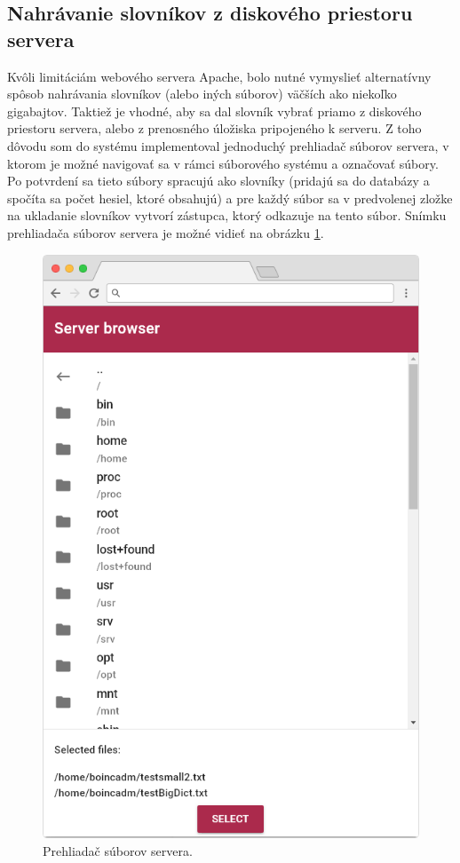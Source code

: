 \documentclass[zadani,slovak]{fitthesis}
\begin{document}
\subsection{Nahrávanie slovníkov z diskového priestoru servera}
Kvôli limitáciám webového servera Apache, bolo nutné vymyslieť alternatívny spôsob nahrávania slovníkov (alebo iných súborov) väčších ako niekoľko gigabajtov. Taktiež je vhodné, aby sa dal slovník vybrať priamo z diskového priestoru servera, alebo z prenosného úložiska pripojeného k serveru. Z toho dôvodu som do systému implementoval jednoduchý prehliadač súborov servera, v ktorom je možné navigovať sa v rámci súborového systému a označovať súbory. Po potvrdení sa tieto súbory spracujú ako slovníky (pridajú sa do databázy a spočíta sa počet hesiel, ktoré obsahujú) a pre každý súbor sa v predvolenej zložke na ukladanie slovníkov vytvorí zástupca, ktorý odkazuje na tento súbor. Snímku prehliadača súborov servera je možné vidieť na obrázku \ref{fig:serverBrowser}.
\begin{figure}[H]
    \centering
    \includegraphics[scale=0.35]{obrazky/serverBrowserFrame.PNG}
    \caption{Prehliadač súborov servera.}
    \label{fig:serverBrowser}
\end{figure}
\end{document}
